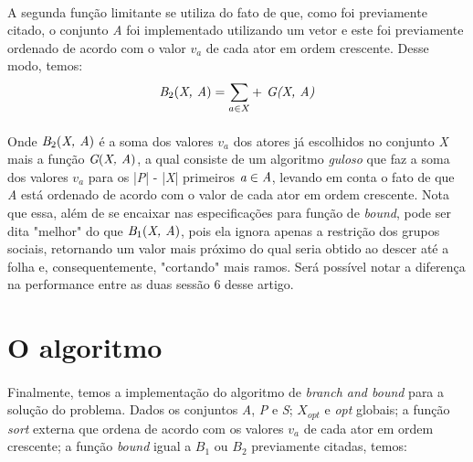 \documentclass{article}
\begin{document}
\paragraph{} A segunda função limitante se utiliza do fato de que, como foi previamente citado, o conjunto \emph{A} foi implementado utilizando um vetor e este foi previamente ordenado de acordo com o valor \emph{$v_a$} de cada ator em ordem crescente. Desse modo, temos:
\begin{equation*}
    \emph{B}_2(\emph{X, A}) = \emph{$\sum_{a \in X} +$ G(X, A)}
\end{equation*}

\begin{algorithm}
    \DontPrintSemicolon
\end{algorithm}

\paragraph{} Onde $\emph{B}_2(\emph{X, A})$ é a soma dos valores \emph{$v_a$} dos atores já escolhidos no conjunto \emph{X} mais a função $\emph{G}(\emph{X, A})$, a qual consiste de um algoritmo \emph{guloso} que faz a soma dos valores \emph{$v_a$} para os |\emph{P}| - |\emph{X}| primeiros $\emph{a} \in \emph{A}$, levando em conta o fato de que \emph{A} está ordenado de acordo com o valor de cada ator em ordem crescente. Nota que essa, além de se encaixar nas especificações para função de \emph{bound}, pode ser dita "melhor" do que $\emph{B}_1(\emph{X, A})$, pois ela ignora apenas a restrição dos grupos sociais, retornando um valor mais próximo do qual seria obtido ao descer até a folha e, consequentemente, "cortando" mais ramos. Será possível notar a diferença na performance entre as duas sessão 6 desse artigo.
\pagebreak

\section{O algoritmo}

\paragraph{} Finalmente, temos a implementação do algoritmo de \emph{branch and bound} para a solução do problema. Dados os conjuntos \emph{A}, \emph{P} e \emph{S}; \emph{$X_{opt}$} e \emph{opt} globais; a função \emph{sort} externa que ordena de acordo com os valores \emph{$v_a$} de cada ator em ordem crescente; a função \emph{bound} igual a \emph{$B_1$} ou \emph{$B_2$} previamente citadas, temos:
\end{document}
